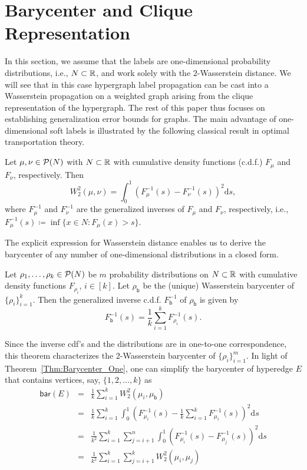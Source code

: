 \documentclass[letterpaper]{article} %
\begin{document}
\section{Barycenter and Clique Representation}
In this section, we assume that the labels are one-dimensional probability distributions, i.e., $N\subset \R$, and work solely with the $2$-Wasserstein distance. We will see that in this case hypergraph label propagation can be cast into a Wasserstein propagation on a weighted graph arising from the clique representation of the hypergraph. The rest of this paper thus focuses on establishing generalization error bounds for graphs. The main advantage of one-dimensional soft labels is illustrated by the following classical result in optimal transportation theory.
\begin{theorem}\label{Thm:Wasserstein_One}
Let $\mu, \nu\in \P(N)$ with $N\subset\R$ with cumulative density functions (c.d.f.) $F_\mu$ and $F_\nu$, respectively. Then $$W_2^2(\mu, \nu)=\int_{0}^1\left(F_\mu^{-1}(s)-F_\nu^{-1}(s)\right)^2\text{d}s,$$
where $F_{\mu}^{-1}$ and $F_{\nu}^{-1}$ are the generalized inverses of $F_\mu$ and $F_\nu$, respectively, i.e., $F_\mu^{-1}(s)\coloneqq \inf\{x\in N:F_\mu(x)>s\}$. 
\end{theorem}
The explicit expression for Wasserstein distance enables us to derive the barycenter of any number of one-dimensional distributions in a closed form. 
\begin{theorem}
\label{Thm:Barycenter_One}
Let $\rho_1, \dots, \rho_k\in \P(N)$ be $m$ probability distributions on $N\subset\R$ with cumulative density functions $F_{\rho_i}$, $i\in [k]$. Let $\rho_{\mathsf{b}}$ be the (unique) Wasserstein barycenter of $\{\rho_i\}_{i=1}^k$. Then the generalized inverse c.d.f. $F^{-1}_{\mathsf{b}}$ of $\rho_{\mathsf{b}}$ is given by 
$$F^{-1}_{\mathsf{b}}(s)=\frac{1}{k}\sum_{i=1}^kF_{\rho_i}^{-1}(s).$$
\end{theorem}
Since the inverse cdf's and the distributions are in one-to-one correspondence, this theorem characterizes the $2$-Wasserstein barycenter of $\{\rho_i\}_{i=1}^m$. In light of Theorem~\ref{Thm:Barycenter_One}, one can simplify the barycenter of hyperedge $E$ that contains vertices, say, $\{1, 2, \dots, k\}$ as
\begin{eqnarray}
\mathsf{bar}(E) &=& \frac{1}{k}\sum_{i=1}^kW^2_2(\mu_i, \mu_\mathsf{b})\nonumber\\
&=&\frac{1}{k}\sum_{i=1}^k\int_{0}^{1}\left(F_{\mu_i}^{-1}(s)-\frac{1}{k}\sum_{i=1}^kF_{\mu_i}^{-1}(s)\right)^2\text{d}s\nonumber\\
&=&\frac{1}{k^2}\sum_{i=1}^k\sum_{j=i+1}^n\int_0^1\left(F_{\mu_i}^{-1}(s)-F_{\mu_j}^{-1}(s)\right)^2 \text{d}s \nonumber\\
&=&\frac{1}{k^2}\sum_{i=1}^k\sum_{j=i+1}^kW_2^2(\mu_i, \mu_j)\label{Eq:One_D_Equivalence}
\end{eqnarray}
\end{document}
